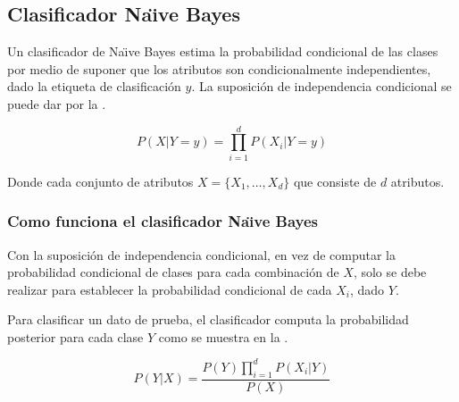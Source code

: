 \subsection{Clasificador Na\"{\i}ve Bayes} \label{subsec:naivebayes}
Un clasificador de Na\"{\i}ve Bayes estima la probabilidad condicional de las clases por medio de suponer que los atributos son condicionalmente independientes, dado la etiqueta de clasificación $y$. La suposición de independencia condicional se puede dar por la .

\begin{equation} \label{eq:bayes-conditional-independence}
  P(X|Y=y) = \prod_{i=1}^{d} P(X_i|Y=y)
\end{equation}

Donde cada conjunto de atributos $X=\{ X_1, \ldots, X_d \}$ que consiste de $d$ atributos.
\subsubsection{Como funciona el clasificador Na\"{\i}ve Bayes}
Con la suposición de independencia condicional, en vez de computar la probabilidad condicional de clases para cada combinación de $X$, solo se debe realizar para establecer la probabilidad condicional de cada $X_i$, dado $Y$.

Para clasificar un dato de prueba, el clasificador computa la probabilidad posterior para cada clase $Y$ como se muestra en la .

\begin{equation} \label{eq:bayes-classifier}
  P(Y|X) = \frac{P(Y) \prod_{i=1}^{d}P(X_i|Y)}{P(X)}
\end{equation}

